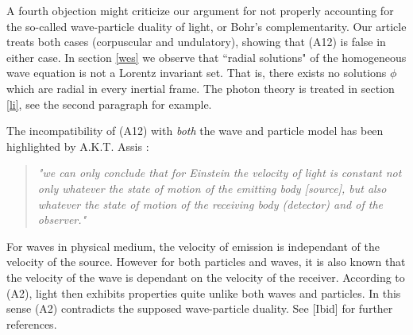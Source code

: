 \documentclass[12pt]{amsart}
\theoremstyle{definition}
\theoremstyle{remark}
\begin{document}

A fourth objection might criticize our argument for not properly accounting for the so-called wave-particle duality of light, or Bohr's complementarity. Our article treats both cases (corpuscular and undulatory), showing that (A12) is false in either case. In section \ref{wes} we observe that ``radial solutions" of the homogeneous wave equation is not a Lorentz invariant set. That is, there exists no solutions $\phi$ which are radial in every inertial frame. The photon theory is treated in section \ref{li}, see the second paragraph for example. %

The incompatibility of (A12) with \emph{both} the wave and particle model has been highlighted by A.K.T. Assis \cite[\S 7.2.4, pp.133]{assis1999relational}:  
\begin{quote} \emph{"we can only conclude that for Einstein the velocity of light is constant not only whatever the state of motion of the emitting body [source], but also whatever the state of motion of the receiving body (detector) and of the observer."} 
\end{quote}
For waves in physical medium, the velocity of emission is independant of the velocity of the source. However for both particles and waves, it is also known that the velocity of the wave is dependant on the velocity of the receiver. According to (A2), light then exhibits properties quite unlike both waves and particles. In this sense (A2) contradicts the supposed wave-particle duality. See [Ibid] for further references. 

\end{document}
